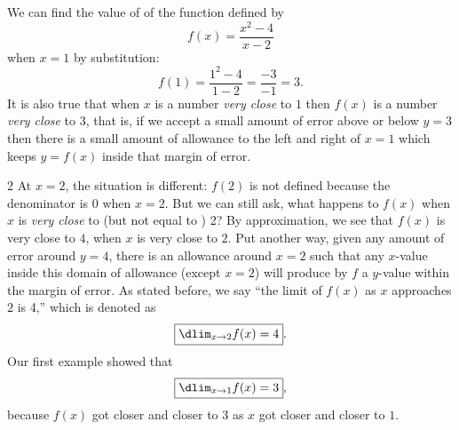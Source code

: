 \documentclass{book}
\begin{document}
\begin{Exam} We can find the value of of the function defined by \[f(x) = \dfrac{x^2-4}{x-2}\] when $x=1$ by substitution:
\[f(1) = \dfrac{1^2-4}{1-2} = \dfrac{-3}{-1} = 3.\] It is also true that when $x$ is a number \emph{very close} to $1$ then $f(x)$ is a number \emph{very close} to 3, that is, if we accept a small amount of error above or below $y=3$ then there is a small amount of allowance to the left and right of $x=1$ which keeps $y=f(x)$ inside that margin of error.\\

\begin{multicols}{2}
At $x=2$, the situation is different: $f(2)$ is not defined because the denominator is 0 when $x=2$. But we can still ask, what happens to $f(x)$ when $x$ is \emph{very close} to (but not equal to ) 2? By approximation, we see that $f(x)$ is very close to $4$, when $x$ is very close to $2$. Put another way, given any amount of error around $y=4$, there is an allowance around $x=2$ such that any $x$-value inside this domain of allowance (except $x=2$) will produce by $f$ a $y$-value within the margin of error. As stated before, we say ``the limit of $f(x)$ as $x$ approaches $2$ is 4,'' which is denoted as 
\[\fbox{$\dlim_{x\to 2}f(x) = 4$}.\] Our first example showed that \[\fbox{$\dlim_{x\to 1}f(x) = 3$},\] because $f(x)$ got closer and closer to 3 as $x$ got closer and closer to $1$.\footnotemark \columnbreak 

\mbox{}\\
\begin{center}
\end{center}
\end{multicols}
\end{Exam}\vs
\end{document}

